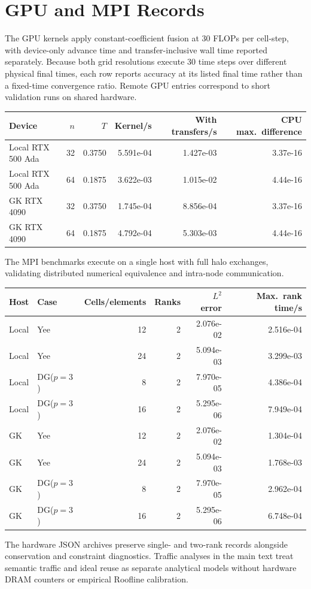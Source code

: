 \section{GPU and MPI Records}
The GPU kernels apply constant-coefficient fusion at 30 FLOPs per cell-step, with device-only advance time and transfer-inclusive wall time reported separately. Because both grid resolutions execute 30 time steps over different physical final times, each row reports accuracy at its listed final time rather than a fixed-time convergence ratio. Remote GPU entries correspond to short validation runs on shared hardware.
\begin{center}\small\begin{tabular}{lrrrrr}\toprule
Device & $n$ & $T$ & Kernel/s & With transfers/s & CPU max.\ difference\\\midrule
Local RTX 500 Ada & 32 & 0.3750 & 5.591e-04 & 1.427e-03 & 3.37e-16\\
Local RTX 500 Ada & 64 & 0.1875 & 3.622e-03 & 1.015e-02 & 4.44e-16\\
GK RTX 4090 & 32 & 0.3750 & 1.745e-04 & 8.856e-04 & 3.37e-16\\
GK RTX 4090 & 64 & 0.1875 & 4.792e-04 & 5.303e-03 & 4.44e-16\\
\bottomrule\end{tabular}\end{center}
The MPI benchmarks execute on a single host with full halo exchanges, validating distributed numerical equivalence and intra-node communication.
\begin{center}\small\begin{tabular}{llrrrr}\toprule
Host & Case & Cells/elements & Ranks & $L^2$ error & Max.\ rank time/s\\\midrule
Local & Yee & 12 & 2 & 2.076e-02 & 2.516e-04\\
Local & Yee & 24 & 2 & 5.094e-03 & 3.299e-03\\
Local & DG($p=3$) & 8 & 2 & 7.970e-05 & 4.386e-04\\
Local & DG($p=3$) & 16 & 2 & 5.295e-06 & 7.949e-04\\
GK & Yee & 12 & 2 & 2.076e-02 & 1.304e-04\\
GK & Yee & 24 & 2 & 5.094e-03 & 1.768e-03\\
GK & DG($p=3$) & 8 & 2 & 7.970e-05 & 2.962e-04\\
GK & DG($p=3$) & 16 & 2 & 5.295e-06 & 6.748e-04\\
\bottomrule\end{tabular}\end{center}
The hardware JSON archives preserve single- and two-rank records alongside conservation and constraint diagnostics. Traffic analyses in the main text treat semantic traffic and ideal reuse as separate analytical models without hardware DRAM counters or empirical Roofline calibration.

